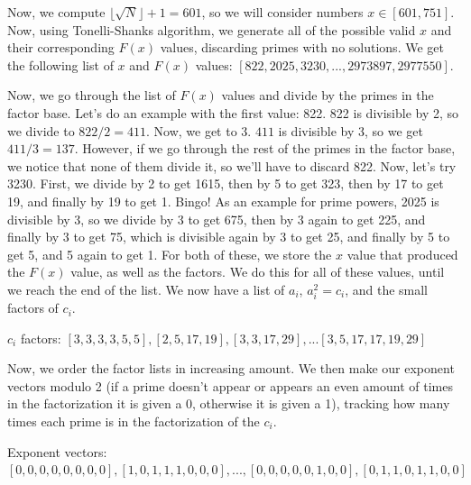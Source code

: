 \documentclass[11pt,reqno]{amsart}
\theoremstyle{definition}
\begin{document}
Now, we compute $\lfloor \sqrt{N} \rfloor + 1 = 601$, so we will consider numbers $x \in [601, 751]$. Now, using Tonelli-Shanks algorithm, we generate all of the possible valid $x$ and their corresponding $F(x)$ values, discarding primes with no solutions. We get the following list of $x$ and $F(x)$ values:
$[822, 2025, 3230, ..., 2973897, 2977550]$. 


Now, we go through the list of $F(x)$ values and divide by the primes in the factor base. Let's do an example with the first value: 822. 822 is divisible by 2, so we divide to $822 / 2 = 411$. Now, we get to 3. $411$ is divisible by 3, so we get $411 / 3 = 137$. However, if we go through the rest of the primes in the factor base, we notice that none of them divide it, so we'll have to discard 822. Now, let's try 3230. First, we divide by 2 to get 1615, then by 5 to get 323, then by 17 to get 19, and finally by 19 to get 1. Bingo! As an example for prime powers, 2025 is divisible by 3, so we divide by 3 to get 675, then by 3 again to get 225, and finally by 3 to get 75, which is divisible again by 3 to get 25, and finally by 5 to get 5, and 5 again to get 1. For both of these, we store the $x$ value that produced the $F(x)$ value, as well as the factors. We do this for all of these values, until we reach the end of the list. We now have a list of $a_i$, $a_i^2 = c_i$, and the small factors of $c_i$. 

$c_i$ factors: $[3, 3, 3, 3, 5, 5], [2, 5, 17, 19], [3, 3, 17, 29], ... [3, 5, 17, 17, 19, 29]$


Now, we order the factor lists in increasing amount. We then make our exponent vectors modulo 2 (if a prime doesn't appear or appears an even amount of times in the factorization it is given a 0, otherwise it is given a 1), tracking how many times each prime is in the factorization of the $c_i$. 

Exponent vectors: $[0, 0, 0, 0, 0, 0, 0, 0], [1, 0, 1, 1, 1, 0, 0, 0], ..., [0, 0, 0, 0, 0, 1, 0, 0], [0, 1, 1, 0, 1, 1, 0, 0]$
\end{document}
